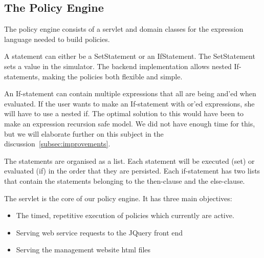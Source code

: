 \subsection{The Policy Engine}\label{subsec:policyengine}
The policy engine consists of a servlet and domain classes for the expression language needed to build policies. 

A statement can either be a SetStatement or an IfStatement. The SetStatement sets a value in the simulator. The backend implementation allows nested If-statements, making the policies both flexible and simple. 

An If-statement can contain multiple expressions that all are being and'ed when evaluated. If the user wants to make an If-statement with or'ed expressions, she will have to use a nested if. The optimal solution to this would have been to make an expression recursion safe model. We did not have enough time for this, but we will elaborate further on this subject in the discussion~\ref{subsec:improvements}. 

The statements are organised as a list. Each statement will be executed (set) or evaluated (if) in the order that they are persisted. Each if-statement has two lists that contain the statements belonging to the then-clause and the else-clause.

The servlet is the core of our policy engine. It has three main objectives:

\begin{figure}[b]
\end{figure}

\begin{itemize}
	\item The timed, repetitive execution of policies which currently are active.
	\item Serving web service requests to the JQuery front end
	\item Serving the management website html files
\end{itemize}

